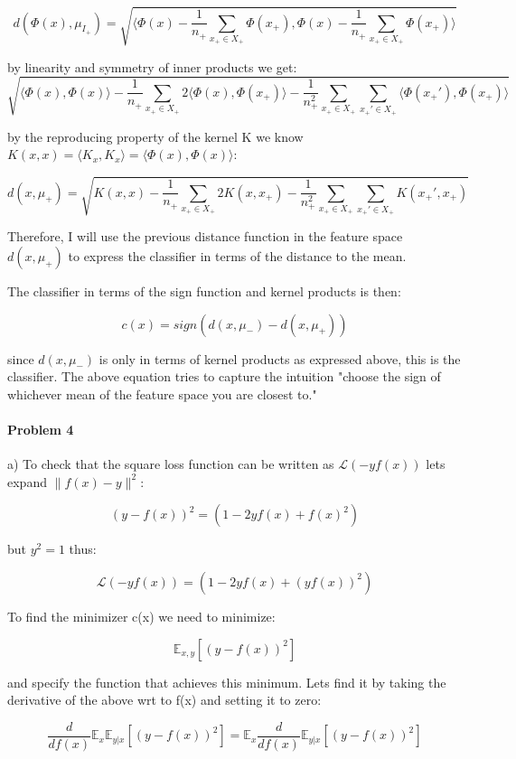 \documentclass[12pt]{report}
\begin{document}
$$d(\Phi(x),  \mu_{I_+}) = \sqrt{ \langle \Phi(x) -  \frac{1}{n_+}\sum_{x_+ \in X_+}\Phi(x_+),   \Phi(x) - \frac{1}{n_+}\sum_{x_+  \in X_+}\Phi(x_+) \rangle }$$

by linearity and symmetry of inner products we get:
 $$\sqrt{ \langle \Phi(x), \Phi(x) \rangle - \frac{1}{n_+} \sum_{x_+ \in X_+} 2\langle \Phi(x), \Phi(x_+) \rangle - \frac{1}{n_+^2}\sum_{x_+ \in X_+} \sum_{x_+' \in X_+}  \langle  \Phi(x_+') , \Phi(x_+) \rangle       }$$
 
by the reproducing property of the kernel K we know $K(x,x) = \langle K_x, K_x \rangle =\langle \Phi(x), \Phi(x) \rangle$:
 
$$ d(x, \mu_+) = \sqrt{ K(x,x) - \frac{1}{n_+} \sum_{x_+ \in X_+} 2K(x, x_+) - \frac{1}{n_+^2} \sum_{x_+ \in X_+} \sum_{x_+' \in X_+}  K(x_+', x_+)       }$$

Therefore, I will use the previous distance function in the feature space $ d(x, \mu_+)$ to express the classifier in terms of the distance to the mean.

The classifier in terms of the sign function and kernel products is then:

$$c(x) = sign(d(x, \mu_-) - d(x, \mu_+))$$

since $d(x, \mu_-)$ is only in terms of kernel products as expressed above, this is the classifier. The above equation tries to capture the intuition "choose the sign of whichever mean of the feature space you are closest to."

\paragraph{Problem 4}
a) To check that the square loss function can be written as $\mathcal{L}(-yf(x))$ lets expand $\|f(x) - y\|^2$:

$$(y-f(x))^2 = (1 - 2yf(x) + f(x)^2) $$

but $y^2 = 1$ thus:

$$\mathcal{L}(-yf(x)) = (1 - 2yf(x) + (yf(x))^2)$$

To find the minimizer c(x) we need to minimize: 

$$\mathbb{E}_{x,y}[(y-f(x))^2]$$

and specify the function that achieves this minimum. Lets find it by taking the derivative of the above wrt to f(x) and setting it to zero:

$$\frac{d}{df(x)}\mathbb{E}_{x}\mathbb{E}_{y|x}[(y-f(x))^2] = \mathbb{E}_{x}\frac{d}{df(x)}\mathbb{E}_{y|x}[(y-f(x))^2]$$
\end{document}
